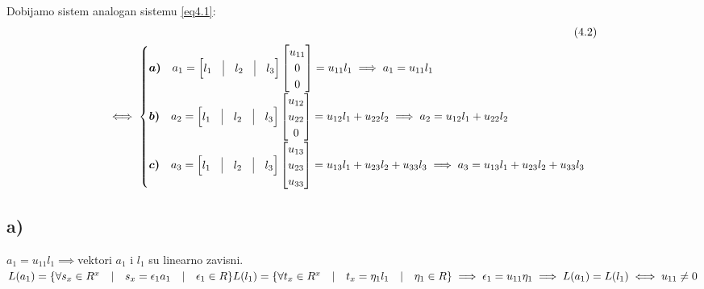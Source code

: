 \documentclass[11pt]{article}
\begin{document}
Dobijamo sistem analogan sistemu \eqref{eq4.1}:
\begin{align*}
\tag{4.2}\label{eq4.2}
\\
\iff \begin{cases}
\boldsymbol{a)} \quad a_1= \begin{bmatrix}
l_1 & \vline & l_2 & \vline & l_3
\end{bmatrix}\begin{bmatrix}u_{11} \\ 0 \\ 0 \end{bmatrix}
=u_{11}l_1 \implies a_1=u_{11}l_1\\
\boldsymbol{b)} \quad a_2= \begin{bmatrix}
l_1 & \vline & l_2 & \vline & l_3
\end{bmatrix}\begin{bmatrix}u_{12} \\ u_{22} \\ 0 \end{bmatrix}
=u_{12}l_1 + u_{22}l_2 \implies a_2=u_{12}l_1+u_{22}l_2\\
\boldsymbol{c)} \quad a_3= \begin{bmatrix}
l_1 & \vline & l_2 & \vline & l_3
\end{bmatrix}\begin{bmatrix}u_{13} \\ u_{23} \\ u_{33} \end{bmatrix}
=u_{13}l_1 + u_{23}l_2 + u_{33}l_3\implies a_3=u_{13}l_1+u_{23}l_2+u_{33}l_3\\
\end{cases}
\end{align*}
\subsection*{a)}
$a_1=u_{11}l_1 \implies  $vektori $a_1$ i $l_1$ su linearno zavisni. \\$ L(a_1)=\{\forall s_x \in R^x\quad | \quad s_x=\epsilon_1 a_1 \quad | \quad \epsilon_1 \in R\}\\L(l_1)=\{\forall t_x \in R^x\quad | \quad t_x=\eta_1 l_1 \quad | \quad \eta_1 \in R\}\vspace{3mm}\\
\implies \epsilon_1=u_{11}\eta_1 \implies L(a_1)=L(l_1) \iff u_{11} \ne 0$
\end{document}
